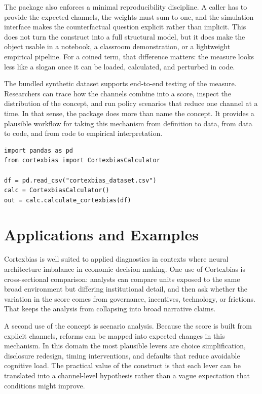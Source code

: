 \documentclass[12pt]{article}
\begin{document}
The package also enforces a minimal reproducibility discipline. A caller has to provide the expected channels, the weights must sum to one, and the simulation interface makes the counterfactual question explicit rather than implicit. This does not turn the construct into a full structural model, but it does make the object usable in a notebook, a classroom demonstration, or a lightweight empirical pipeline. For a coined term, that difference matters: the measure looks less like a slogan once it can be loaded, calculated, and perturbed in code.

The bundled synthetic dataset supports end-to-end testing of the measure. Researchers can trace how the channels combine into a score, inspect the distribution of the concept, and run policy scenarios that reduce one channel at a time. In that sense, the package does more than name the concept. It provides a plausible workflow for taking this mechanism from definition to data, from data to code, and from code to empirical interpretation.

\begin{verbatim}
import pandas as pd
from cortexbias import CortexbiasCalculator

df = pd.read_csv("cortexbias_dataset.csv")
calc = CortexbiasCalculator()
out = calc.calculate_cortexbias(df)
\end{verbatim}

\section{Applications and Examples}
Cortexbias is well suited to applied diagnostics in contexts where neural architecture imbalance in economic decision making. One use of Cortexbias is cross-sectional comparison: analysts can compare units exposed to the same broad environment but differing institutional detail, and then ask whether the variation in the score comes from governance, incentives, technology, or frictions. That keeps the analysis from collapsing into broad narrative claims.

A second use of the concept is scenario analysis. Because the score is built from explicit channels, reforms can be mapped into expected changes in this mechanism. In this domain the most plausible levers are choice simplification, disclosure redesign, timing interventions, and defaults that reduce avoidable cognitive load. The practical value of the construct is that each lever can be translated into a channel-level hypothesis rather than a vague expectation that conditions might improve.
\end{document}
